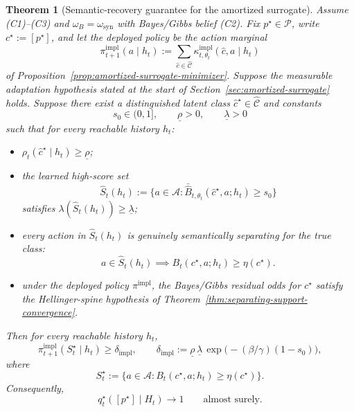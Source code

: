 \documentclass[11pt]{article}
\newtheorem{theorem}{Theorem}[section]
\theoremstyle{definition}
\theoremstyle{remark}
\newcommand{\Acal}{\mathcal{A}}
\newcommand{\Ccal}{\mathcal{C}}
\newcommand{\Pcal}{\mathcal{P}}
\begin{document}
\begin{theorem}[Semantic-recovery guarantee for the amortized surrogate]
\label{thm:amortized-surrogate}
Assume \textup{(C1)--(C3)} and $\omega_B=\omega_{\mathrm{syn}}$ with Bayes/Gibbs belief \textup{(C2)}. Fix $p^\star\in\Pcal$, write $c^\star:=[p^\star]$, and let the deployed policy be the action marginal
\[
\pi_{t+1}^{\mathrm{impl}}(a\mid h_t)
:=
\sum_{\hat c\in\widehat{\Ccal}}
\kappa_{t,\theta_t}^{\mathrm{impl}}(\hat c,a\mid h_t)
\]
of Proposition~\ref{prop:amortized-surrogate-minimizer}. Suppose the measurable adaptation hypothesis stated at the start of Section~\ref{sec:amortized-surrogate} holds. Suppose there exist a distinguished latent class $\hat c^\star\in\widehat{\Ccal}$ and constants
\[
s_0\in(0,1],
\qquad
\underline\rho>0,
\qquad
\underline\lambda>0
\]
such that for every reachable history $h_t$:
\begin{itemize}
\item[(A1)] $\rho_t(\hat c^\star\mid h_t)\ge \underline\rho$;
\item[(A2)] the learned high-score set
\[
\widehat S_t(h_t)
:=
\{a\in\Acal:\bar{\widehat B}_{t,\theta_t}(\hat c^\star,a;h_t)\ge s_0\}
\]
satisfies $\lambda(\widehat S_t(h_t))\ge \underline\lambda$;
\item[(A3)] every action in $\widehat S_t(h_t)$ is genuinely semantically separating for the true class:
\[
a\in \widehat S_t(h_t)
\implies
B_t(c^\star,a;h_t)\ge \eta(c^\star).
\]
\item[(A4)] under the deployed policy $\pi^{\mathrm{impl}}$, the Bayes/Gibbs residual odds for $c^\star$ satisfy the Hellinger-spine hypothesis of Theorem~\ref{thm:separating-support-convergence}.
\end{itemize}
Then for every reachable history $h_t$,
\[
\pi_{t+1}^{\mathrm{impl}}(S_t^\star\mid h_t)\ge \delta_{\mathrm{impl}},
\qquad
\delta_{\mathrm{impl}}
:=
\underline\rho\,\underline\lambda\,
\exp\!\bigl(-(\beta/\gamma)(1-s_0)\bigr),
\]
where
\[
S_t^\star
:=
\{a\in\Acal:B_t(c^\star,a;h_t)\ge \eta(c^\star)\}.
\]
Consequently,
\[
q_t^\star([p^\star]\mid H_t)\longrightarrow 1
\qquad
\text{almost surely.}
\]
\end{theorem}
\end{document}
